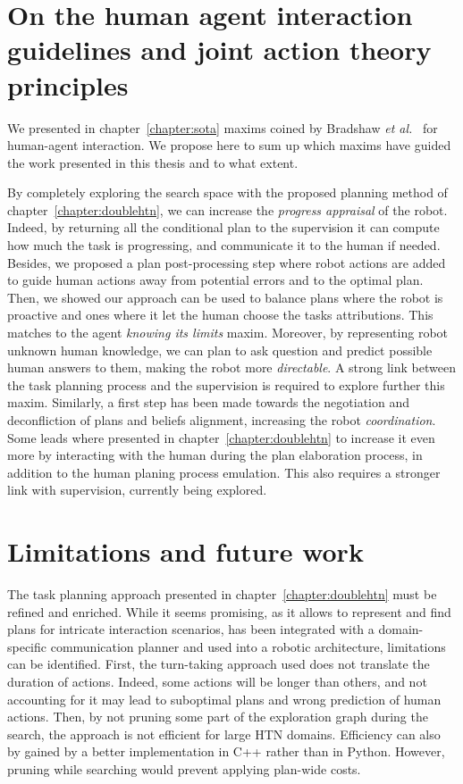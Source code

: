 \documentclass[a4paper,11pt,twoside]{StyleThese}
\begin{document}
\section*{On the human agent interaction guidelines and joint action theory principles}
We presented in chapter~\ref{chapter:sota} maxims coined by Bradshaw \textit{et al.}~\cite{bradshaw2011human} for human-agent interaction. We propose here to sum up which maxims have guided the work presented in this thesis and to what extent.

By completely exploring the search space with the proposed planning method of chapter~\ref{chapter:doublehtn}, we can increase the \textit{progress appraisal} of the robot. Indeed, by returning all the conditional plan to the supervision it can compute how much the task is progressing, and communicate it to the human if needed. Besides, we proposed a plan post-processing step where robot actions are added to guide human actions away from potential errors and to the optimal plan.
Then, we showed our approach can be used to balance plans where the robot is proactive and ones where it let the human choose the tasks attributions. This matches to the agent \textit{knowing its limits} maxim.
Moreover, by representing robot unknown human knowledge, we can plan to ask question and predict possible human answers to them, making the robot more \textit{directable}. A strong link between the task planning process and the supervision is required to explore further this maxim.
Similarly, a first step has been made towards the negotiation and deconfliction of plans and beliefs alignment, increasing the robot \textit{coordination}. Some leads where presented in chapter~\ref{chapter:doublehtn} to increase it even more by interacting with the human during the plan elaboration process, in addition to the human planing process emulation. This also requires a stronger link with supervision, currently being explored.

\section*{Limitations and future work}
The task planning approach presented in chapter~\ref{chapter:doublehtn} must be refined and enriched. While it seems promising, as it allows to represent and find plans for intricate interaction scenarios, has been integrated with a domain-specific communication planner and used into a robotic architecture, limitations can be identified. First, the turn-taking approach used does not translate the duration of actions. Indeed, some actions will be longer than others, and not accounting for it may lead to suboptimal plans and wrong prediction of human actions. Then, by not pruning some part of the exploration graph during the search, the approach is not efficient for large HTN domains. Efficiency can also by gained by a better implementation in C++ rather than in Python. However, pruning while searching would prevent applying plan-wide costs.
\end{document}
